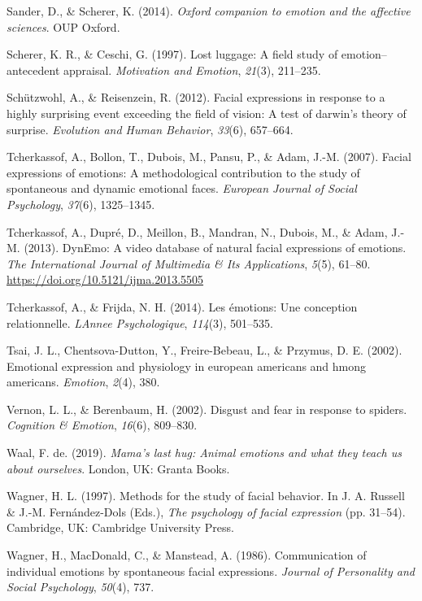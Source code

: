 \documentclass[man]{apa6}
\begin{document}
\leavevmode\hypertarget{ref-sander2014oxford}{}%
Sander, D., \& Scherer, K. (2014). \emph{Oxford companion to emotion and the affective sciences}. OUP Oxford.

\leavevmode\hypertarget{ref-scherer1997lost}{}%
Scherer, K. R., \& Ceschi, G. (1997). Lost luggage: A field study of emotion--antecedent appraisal. \emph{Motivation and Emotion}, \emph{21}(3), 211--235.

\leavevmode\hypertarget{ref-schutzwohl2012facial}{}%
Schützwohl, A., \& Reisenzein, R. (2012). Facial expressions in response to a highly surprising event exceeding the field of vision: A test of darwin's theory of surprise. \emph{Evolution and Human Behavior}, \emph{33}(6), 657--664.

\leavevmode\hypertarget{ref-tcherkassof2007facial}{}%
Tcherkassof, A., Bollon, T., Dubois, M., Pansu, P., \& Adam, J.-M. (2007). Facial expressions of emotions: A methodological contribution to the study of spontaneous and dynamic emotional faces. \emph{European Journal of Social Psychology}, \emph{37}(6), 1325--1345.

\leavevmode\hypertarget{ref-tcherkassof2013dynemo}{}%
Tcherkassof, A., Dupré, D., Meillon, B., Mandran, N., Dubois, M., \& Adam, J.-M. (2013). DynEmo: A video database of natural facial expressions of emotions. \emph{The International Journal of Multimedia \& Its Applications}, \emph{5}(5), 61--80. \url{https://doi.org/10.5121/ijma.2013.5505}

\leavevmode\hypertarget{ref-tcherkassof2014emotions}{}%
Tcherkassof, A., \& Frijda, N. H. (2014). Les émotions: Une conception relationnelle. \emph{LAnnee Psychologique}, \emph{114}(3), 501--535.

\leavevmode\hypertarget{ref-tsai2002emotional}{}%
Tsai, J. L., Chentsova-Dutton, Y., Freire-Bebeau, L., \& Przymus, D. E. (2002). Emotional expression and physiology in european americans and hmong americans. \emph{Emotion}, \emph{2}(4), 380.

\leavevmode\hypertarget{ref-vernon2002disgust}{}%
Vernon, L. L., \& Berenbaum, H. (2002). Disgust and fear in response to spiders. \emph{Cognition \& Emotion}, \emph{16}(6), 809--830.

\leavevmode\hypertarget{ref-de2019mama}{}%
Waal, F. de. (2019). \emph{Mama's last hug: Animal emotions and what they teach us about ourselves}. London, UK: Granta Books.

\leavevmode\hypertarget{ref-wagner1997methods}{}%
Wagner, H. L. (1997). Methods for the study of facial behavior. In J. A. Russell \& J.-M. Fernández-Dols (Eds.), \emph{The psychology of facial expression} (pp. 31--54). Cambridge, UK: Cambridge University Press.

\leavevmode\hypertarget{ref-wagner1986communication}{}%
Wagner, H., MacDonald, C., \& Manstead, A. (1986). Communication of individual emotions by spontaneous facial expressions. \emph{Journal of Personality and Social Psychology}, \emph{50}(4), 737.

\endgroup
\end{document}
